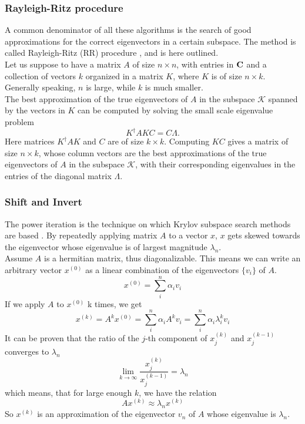 \subsubsection{Rayleigh-Ritz procedure}
\label{sec:rayleigh_ritz}
A common denominator of all these algorithms is the search of good approximations for the correct eigenvectors in a certain subspace. The method is called Rayleigh-Ritz (RR) procedure \cite{Saad1992}, and is here outlined.
\\Let us suppose to have a matrix $A$ of size $n\times n$, with entries in $\mathbf{C}$ and a collection of vectors $k$ organized in a matrix $K$, where $K$ is of size $n\times k$. Generally speaking, $n$ is large, while $k$ is much smaller.
\\The best approximation of the true eigenvectors of $A$ in the subspace $\mathcal K$ spanned by the vectors in $K$ can be computed by solving the small scale eigenvalue problem
\begin{equation}
    K^\dagger A  K C = C\Lambda.
\end{equation}
Here matrices $K^\dagger A K$ and $C$ are of size $k\times k$.
Computing $K C$ gives a matrix of size $n\times k$, whose column vectors are the best approximations of the true eigenvectors of $A$ in the subspace  $\mathcal K$, with their corresponding eigenvalues in the entries of the diagonal matrix $\Lambda$.
\subsubsection{Shift and Invert}
\label{sec:shift_invert}
The power iteration is the technique on which Krylov subspace search methods are based \cite{golub13}. By repeatedly applying matrix $A$ to a vector $x$, $x$ gets skewed towards the eigenvector whose eigenvalue is of largest magnitude $\lambda_n$.
\\Assume $A$ is a hermitian matrix, thus diagonalizable. This means we can write an arbitrary vector $x^{(0)}$ as a linear combination of the eigenvectors $\{v_i\}$ of $A$.
\begin{equation}
    x^{(0)} = \sum_i^n \alpha_i v_i
\end{equation}
If we apply $A$ to $x^{(0)}$ k times, we get
\begin{equation}
    x^{(k)} = A^k x^{(0)} = \sum_i^n \alpha_i A^k v_i = \sum_i^n \alpha_i\lambda_i ^{k}v_i
\end{equation}
It can be proven that the ratio of the $j$-th component of $x_j^{(k)}$ and $x_j^{(k-1)}$ converges to $\lambda_n$
\begin{equation}
    \label{eq:power_iter_ratio}
    \lim_{k\to\infty} \frac{x_j^{(k)}}{x_j^{(k-1)}} = \lambda_n
\end{equation}
which means, that for large enough $k$, we have the relation
\begin{equation}
    \label{eq:power_iter_lambda}
    A x^{(k)} \approx \lambda_n x^{(k)}
\end{equation}
So $x^{(k)}$ is an approximation of the eigenvector $v_n$ of $A$ whose eigenvalue is $\lambda_n$.
